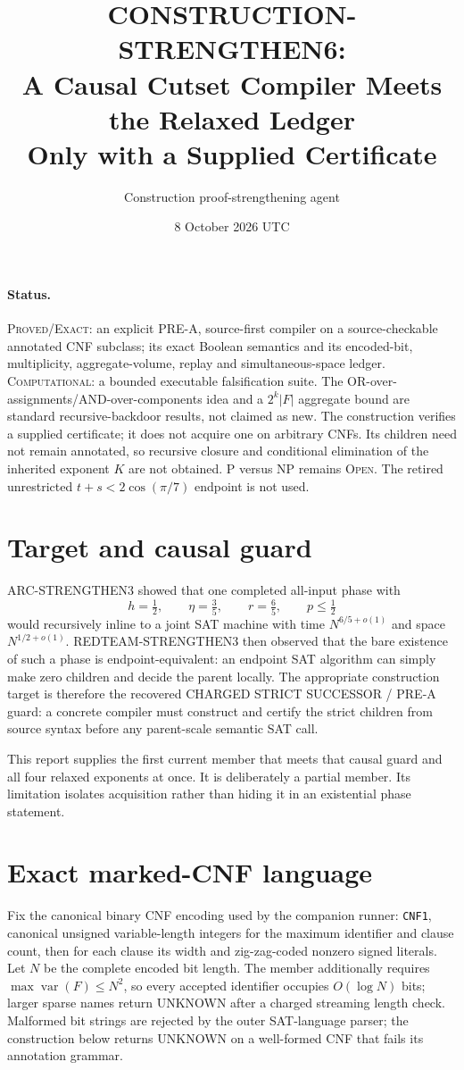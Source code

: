 \documentclass[11pt]{article}
\title{CONSTRUCTION-STRENGTHEN6:\\A Causal Cutset Compiler Meets the Relaxed Ledger\\Only with a Supplied Certificate}
\author{Construction proof-strengthening agent}
\date{8 October 2026 UTC}
\begin{document}
\sloppy\maketitle

\paragraph{Status.}
\textsc{Proved/Exact}: an explicit PRE-A, source-first compiler on a
source-checkable annotated CNF subclass; its exact Boolean semantics and its
encoded-bit, multiplicity, aggregate-volume, replay and simultaneous-space
ledger.  \textsc{Computational}: a bounded executable falsification suite.
The OR-over-assignments/AND-over-components idea and a $2^k|F|$ aggregate
bound are standard recursive-backdoor results, not claimed as new.  The
construction verifies a supplied certificate; it does not acquire one on
arbitrary CNFs.  Its children need not remain annotated, so recursive closure
and conditional elimination of the inherited exponent $K$ are not obtained.
P versus NP remains \textsc{Open}.  The retired unrestricted
$t+s<2\cos(\pi/7)$ endpoint is not used.

\section{Target and causal guard}
ARC-STRENGTHEN3 showed that one completed all-input phase with
\[
 h=\tfrac12,\qquad \eta=\tfrac35,\qquad r=\tfrac65,
 \qquad p\le\tfrac12                                      \tag{1}
\]
would recursively inline to a joint SAT machine with time $N^{6/5+o(1)}$
and space $N^{1/2+o(1)}$.  REDTEAM-STRENGTHEN3 then observed that the bare
existence of such a phase is endpoint-equivalent: an endpoint SAT algorithm
can simply make zero children and decide the parent locally.  The appropriate
construction target is therefore the recovered CHARGED STRICT SUCCESSOR /
PRE-A guard: a concrete compiler must construct and certify the strict
children from source syntax before any parent-scale semantic SAT call.

This report supplies the first current member that meets that causal guard
and all four relaxed exponents at once.  It is deliberately a partial member.
Its limitation isolates acquisition rather than hiding it in an existential
phase statement.

\section{Exact marked-CNF language}
Fix the canonical binary CNF encoding used by the companion runner:
\texttt{CNF1}, canonical unsigned variable-length integers for the maximum
identifier and clause count, then for each clause its width and zig-zag-coded
nonzero signed literals.  Let $N$ be the complete encoded bit length.  The
member additionally requires $\max\operatorname{var}(F)\le N^2$, so every
accepted identifier occupies $O(\log N)$ bits; larger sparse names return
UNKNOWN after a charged streaming length check.  Malformed bit strings are
rejected by the outer SAT-language parser; the construction below returns
UNKNOWN on a well-formed CNF that fails its annotation grammar.
\end{document}
